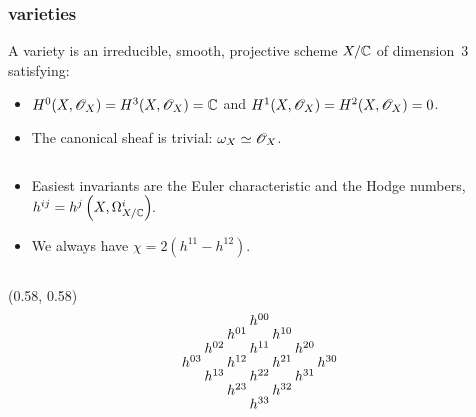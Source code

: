 \begin{frame}
\frametitle{\CY varieties}

\begin{definition}%
    A \alert{\CY variety} is an irreducible, smooth, projective scheme $X/\mathbb{C}$ of dimension~$3$ satisfying:
    \begin{itemize}
      \item
      $H^0(X, \mathscr{O}_X) = H^3(X, \mathscr{O}_X) = \mathbb{C}$ and $H^1(X, \mathscr{O}_X) = H^2(X, \mathscr{O}_X) = 0$.

      \item
      The canonical sheaf is trivial: $\omega_X \simeq \mathscr{O}_X$. 
    \end{itemize}
\end{definition}

\pause

\unskip
\begin{columns}[onlytextwidth]
    \begin{column}{0.6\textwidth}
        \begin{itemize}
          \item
          Easiest invariants are the \alert{Euler characteristic} and the \alert{Hodge numbers}, $h^{ij} = h^j\left(X, \Omega_{X/\mathbb{C}}^i\right)\mkern-2mu$.
          \pause

            \item
            We always have $\chi = 2(h^{11} - h^{12})$. 
        \end{itemize}
    \end{column}
\end{columns}

{
    \begin{textblock}{0.4}(0.58, 0.58)
        \[
            \arraycolsep = 1pt
            \def\arraystretch{0.5}
            \begin{array}[c]{ccccccc}
                &&& h^{00}                               \\  
                &&  h^{01} && h^{10}                     \\
                &   h^{02} && h^{11} && h^{20}           \\
                    h^{03} && h^{12} && h^{21} && h^{30} \\
                &   h^{13} && h^{22} && h^{31}           \\
                &&  h^{23} && h^{32}                     \\
                &&& h^{33} 
            \end{array}
        \]  
    \end{textblock}
}


\end{frame}
